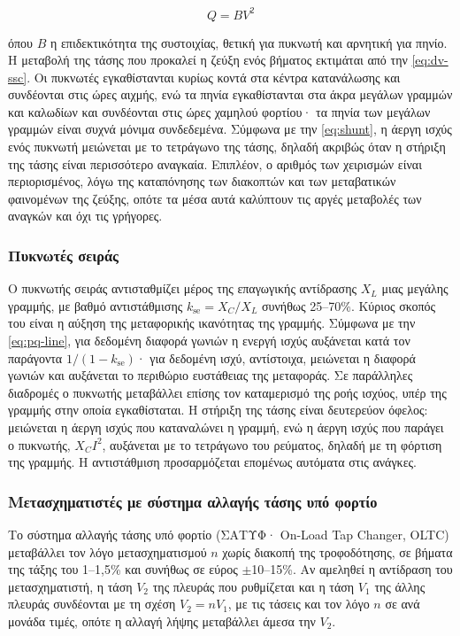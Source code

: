 \begin{equation}
Q = B V^2
\label{eq:shunt}
\end{equation}

όπου $B$ η επιδεκτικότητα της συστοιχίας, θετική για πυκνωτή και αρνητική για πηνίο. Η
μεταβολή της τάσης που προκαλεί η ζεύξη ενός βήματος εκτιμάται από την \eqref{eq:dv-ssc}. Οι
πυκνωτές εγκαθίστανται κυρίως κοντά στα κέντρα κατανάλωσης και συνδέονται στις ώρες αιχμής,
ενώ τα πηνία εγκαθίστανται στα άκρα μεγάλων γραμμών και καλωδίων και συνδέονται στις ώρες
χαμηλού φορτίου· τα πηνία των μεγάλων γραμμών είναι συχνά μόνιμα συνδεδεμένα. Σύμφωνα με την
\eqref{eq:shunt}, η άεργη ισχύς ενός πυκνωτή μειώνεται με το τετράγωνο της τάσης, δηλαδή
ακριβώς όταν η στήριξη της τάσης είναι περισσότερο αναγκαία. Επιπλέον, ο αριθμός των χειρισμών
είναι περιορισμένος, λόγω της καταπόνησης των διακοπτών και των μεταβατικών φαινομένων της
ζεύξης, οπότε τα μέσα αυτά καλύπτουν τις αργές μεταβολές των αναγκών και όχι τις γρήγορες.

\subsubsection{Πυκνωτές σειράς}

Ο πυκνωτής σειράς αντισταθμίζει μέρος της επαγωγικής αντίδρασης $X_L$ μιας μεγάλης γραμμής,
με βαθμό αντιστάθμισης $k_{\mathrm{se}} = X_C / X_L$ συνήθως 25--70\%. Κύριος σκοπός του
είναι η αύξηση της μεταφορικής ικανότητας της γραμμής. Σύμφωνα με
την \eqref{eq:pq-line}, για δεδομένη διαφορά γωνιών η ενεργή ισχύς αυξάνεται κατά τον
παράγοντα $1/(1 - k_{\mathrm{se}})$· για δεδομένη ισχύ, αντίστοιχα, μειώνεται η διαφορά
γωνιών και αυξάνεται το περιθώριο ευστάθειας της μεταφοράς. Σε παράλληλες διαδρομές ο
πυκνωτής μεταβάλλει επίσης τον καταμερισμό της ροής ισχύος, υπέρ της γραμμής στην οποία
εγκαθίσταται. Η στήριξη της τάσης είναι δευτερεύον όφελος: μειώνεται η άεργη ισχύς που
καταναλώνει η γραμμή, ενώ η άεργη ισχύς που παράγει ο πυκνωτής, $X_C I^2$, αυξάνεται με το
τετράγωνο του ρεύματος, δηλαδή με τη φόρτιση της γραμμής. Η αντιστάθμιση προσαρμόζεται
επομένως αυτόματα στις ανάγκες.

\subsubsection{Μετασχηματιστές με σύστημα αλλαγής τάσης υπό φορτίο}
\label{sec:oltc}

Το σύστημα αλλαγής τάσης υπό φορτίο (ΣΑΤΥΦ· On-Load Tap Changer, OLTC) μεταβάλλει τον λόγο
μετασχηματισμού $n$ χωρίς διακοπή της τροφοδότησης, σε βήματα της τάξης του 1--1,5\% και
συνήθως σε εύρος $\pm$10--15\%. Αν αμεληθεί η αντίδραση του μετασχηματιστή, η τάση $V_2$ της
πλευράς που ρυθμίζεται και η τάση $V_1$ της άλλης πλευράς συνδέονται με τη σχέση $V_2 = n V_1$,
με τις τάσεις και τον λόγο $n$ σε ανά μονάδα τιμές, οπότε η αλλαγή λήψης μεταβάλλει άμεσα την
$V_2$.

